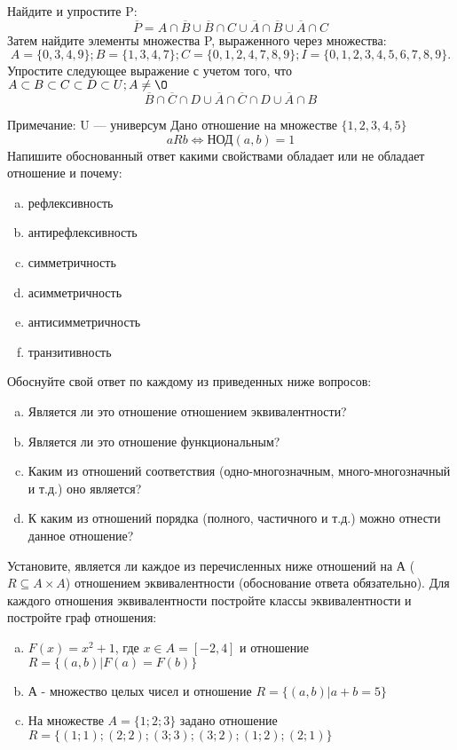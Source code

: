 \documentclass[10pt]{exam}
\begin{document}
\begin{questions}
\question
Найдите и упростите P:
\begin{equation*}
\overline{P} = A \cap \overline{B} \cup \overline{B} \cap C \cup \overline{A} \cap \overline{B} \cup \overline{A} \cap C
\end{equation*}
Затем найдите элементы множества P, выраженного через множества:
\begin{equation*}
A = \{0, 3, 4, 9\}; 
B = \{1, 3, 4, 7\};
C = \{0, 1, 2, 4, 7, 8, 9\};
I = \{0, 1, 2, 3, 4, 5, 6, 7, 8, 9\}.
\end{equation*}\question
Упростите следующее выражение с учетом того, что $A\subset B \subset C \subset D \subset U; A \neq \O$
\begin{equation*}
\overline{B} \cap \overline{C} \cap D \cup \overline{A} \cap \overline{C} \cap D \cup \overline{A} \cap B
\end{equation*}

Примечание: U — универсум\question
Дано отношение на множестве $\{1, 2, 3, 4, 5\}$ 
\begin{equation*}
aRb \iff  \text{НОД}(a,b) =1
\end{equation*}
Напишите обоснованный ответ какими свойствами обладает или не обладает отношение и почему:   
\begin{enumerate} [a)]\setcounter{enumi}{0}
\item рефлексивность
\item антирефлексивность
\item симметричность
\item асимметричность
\item антисимметричность
\item транзитивность
\end{enumerate}

Обоснуйте свой ответ по каждому из приведенных ниже вопросов:
\begin{enumerate} [a)]\setcounter{enumi}{0}
    \item Является ли это отношение отношением эквивалентности?
    \item Является ли это отношение функциональным?
    \item Каким из отношений соответствия (одно-многозначным, много-многозначный и т.д.) оно является?
    \item К каким из отношений порядка (полного, частичного и т.д.) можно отнести данное отношение?
\end{enumerate}


\question
Установите, является ли каждое из перечисленных ниже отношений на А ($R \subseteq A \times A$) отношением эквивалентности (обоснование ответа обязательно). Для каждого отношения эквивалентности постройте классы эквивалентности и постройте граф отношения:
\begin{enumerate} [a)]\setcounter{enumi}{0}
\item $F(x)=x^{2}+1$, где $x \in A = [-2, 4]$ и отношение $R = \{(a,b)|F(a) = F(b)\}$
\item А - множество целых чисел и отношение $R = \{(a,b)|a + b = 5\}$
\item На множестве $A = \{1; 2; 3\}$ задано отношение $R = \{(1; 1); (2; 2); (3; 3); (3; 2); (1; 2); (2; 1)\}$


\end{enumerate}
\end{questions}
\end{document}
